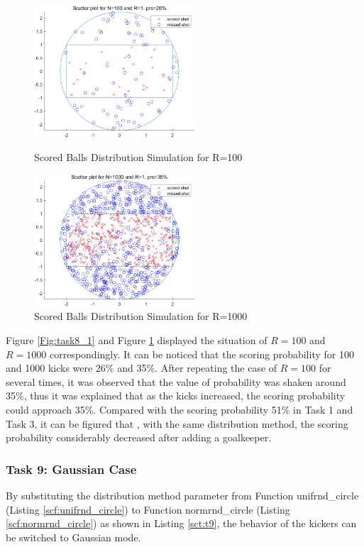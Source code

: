 \documentclass[11pt, a4paper]{article}
\begin{document}
\begin{figure}[htbp]
\centering
\begin{minipage}[t]{0.48\textwidth}
\centering
\includegraphics[width=6cm]{img/t8_1.png}
\caption{Scored Balls Distribution Simulation for R=100}
\label{Fig:task8_1}
\end{minipage}
\begin{minipage}[t]{0.48\textwidth}
\centering
\includegraphics[width=6cm]{img/t8_2.png}
\caption{Scored Balls Distribution Simulation for R=1000}
\label{Fig:task8_2}
\end{minipage}
\end{figure}

Figure \ref{Fig:task8_1} and Figure \ref{Fig:task8_2} displayed the situation of $R=100$ and $R=1000$ correspondingly. It can be noticed that the scoring probability for 100 and 1000 kicks were 26\% and 35\%. After repeating the case of $R=100$ for several times, it was observed that the value of probability was shaken around 35\%, thus it was explained that as the kicks increased, the scoring probability could approach 35\%. Compared with the scoring probability 51\% in Task 1 and Task 3, it can be figured that , with the same distribution method, the scoring probability considerably decreased after adding a goalkeeper.


\subsubsection{Task 9: Gaussian Case}

By substituting the distribution method parameter from Function unifrnd\_circle (Listing \ref{scf:unifrnd_circle}) to Function normrnd\_circle (Listing \ref{scf:normrnd_circle}) as shown in Listing \ref{sct:t9}, the behavior of the kickers can be switched to Gaussian mode.
\end{document}
